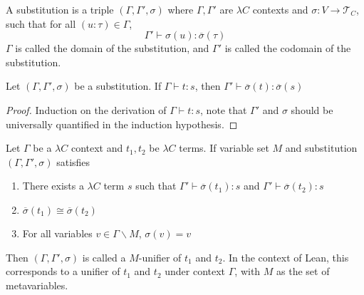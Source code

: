 \begin{definition} A substitution is a triple $(\Gamma, \Gamma', \sigma)$ where $\Gamma, \Gamma'$ are $\lambda C$ contexts
  and $\sigma : V \to \mathcal{T}_C$, such that for all $(u : \tau) \in \Gamma$,
  $$\Gamma' \vdash \sigma(u) : \overline{\sigma}(\tau)$$
  $\Gamma$ is called the domain of the substitution, and $\Gamma'$ is called the codomain of the substitution.
\end{definition}

\begin{theorem}
  Let $(\Gamma, \Gamma', \sigma)$ be a substitution. If $\Gamma \vdash t : s$, then $\Gamma' \vdash \overline{\sigma}(t) : \overline{\sigma}(s)$
\end{theorem}
\begin{proof} Induction on the derivation of $\Gamma \vdash t : s$, note that $\Gamma'$ and $\sigma$
  should be universally quantified in the induction hypothesis.
\end{proof}

\begin{definition} Let $\Gamma$ be a $\lambda C$ context and $t_1, t_2$ be $\lambda C$ terms.
  If variable set $M$ and substitution $(\Gamma, \Gamma', \sigma)$ satisfies
  \begin{enumerate}
    \item There exists a $\lambda C$ term $s$ such that $\Gamma' \vdash \overline{\sigma}(t_1) : s$ and $\Gamma' \vdash \overline{\sigma}(t_2) : s$
    \item $\overline{\sigma}(t_1) \cong \overline{\sigma}(t_2)$
    \item For all variables $v \in \Gamma \backslash M$, $\sigma(v) = v$
  \end{enumerate}
  \noindent Then $(\Gamma, \Gamma', \sigma)$ is called a $M$-unifier of $t_1$ and $t_2$. In the context of Lean,
  this corresponds to a unifier of $t_1$ and $t_2$ under context $\Gamma$, with $M$ as the set of metavariables.
\end{definition}

